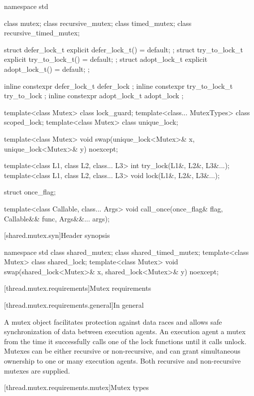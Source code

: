 %
\begin{codeblock}
namespace std {
  class mutex;
  class recursive_mutex;
  class timed_mutex;
  class recursive_timed_mutex;

  struct defer_lock_t { explicit defer_lock_t() = default; };
  struct try_to_lock_t { explicit try_to_lock_t() = default; };
  struct adopt_lock_t { explicit adopt_lock_t() = default; };

  inline constexpr defer_lock_t  defer_lock { };
  inline constexpr try_to_lock_t try_to_lock { };
  inline constexpr adopt_lock_t  adopt_lock { };

  template<class Mutex> class lock_guard;
  template<class... MutexTypes> class scoped_lock;
  template<class Mutex> class unique_lock;

  template<class Mutex>
    void swap(unique_lock<Mutex>& x, unique_lock<Mutex>& y) noexcept;

  template<class L1, class L2, class... L3> int try_lock(L1&, L2&, L3&...);
  template<class L1, class L2, class... L3> void lock(L1&, L2&, L3&...);

  struct once_flag;

  template<class Callable, class... Args>
    void call_once(once_flag& flag, Callable&& func, Args&&... args);
}
\end{codeblock}

[shared.mutex.syn]{Header  synopsis}

%
\begin{codeblock}
namespace std {
  class shared_mutex;
  class shared_timed_mutex;
  template<class Mutex> class shared_lock;
  template<class Mutex>
    void swap(shared_lock<Mutex>& x, shared_lock<Mutex>& y) noexcept;
}
\end{codeblock}

[thread.mutex.requirements]{Mutex requirements}

[thread.mutex.requirements.general]{In general}

\pnum
A mutex object facilitates protection against data races and allows safe synchronization of
data between execution agents.
An execution agent  a mutex from the time it successfully calls one of the
lock functions until it calls unlock. Mutexes can be either recursive or non-recursive, and can
grant simultaneous ownership to one or many execution agents. Both
recursive and non-recursive mutexes are supplied.

[thread.mutex.requirements.mutex]{Mutex types}

